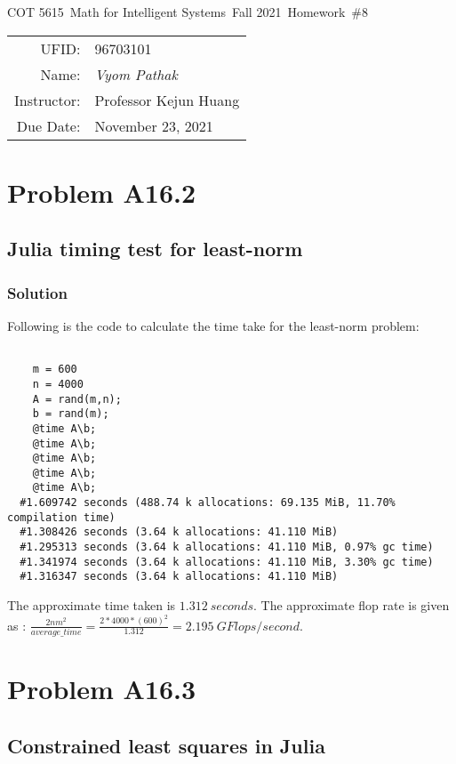 \documentclass{article}
\newcommand{\hmwkTitle}{Homework\ \#8}
\newcommand{\hmwkDueDate}{November 23, 2021}
\newcommand{\hmwkClassCode}{COT 5615}
\newcommand{\hmwkClass}{Math for Intelligent Systems}
\newcommand{\hmwkClassYear}{Fall 2021}
\newcommand{\hmwkClassInstructor}{Professor Kejun Huang}
\newcommand{\hmwkAuthorName}{\textit{Vyom Pathak}}
\newcommand{\hmwkUFID}{96703101}
\begin{document}
\begin{center}
{\Large \hmwkClassCode\ \hmwkClass\ \hmwkClassYear\ \hmwkTitle}

\begin{tabular}{rl}
UFID: & \hmwkUFID \\
Name: & \hmwkAuthorName \\
Instructor: & \hmwkClassInstructor \\
Due Date: & \hmwkDueDate \\ 
\end{tabular}
\end{center}

\section*{Problem A16.2}
\subsection*{Julia timing test for least-norm}
\subsubsection*{Solution}
Following is the code to calculate the time take for the least-norm problem:
\begin{verbatim}
    
    m = 600
    n = 4000
    A = rand(m,n);
    b = rand(m);
    @time A\b;
    @time A\b;
    @time A\b;
    @time A\b;
    @time A\b;
  #1.609742 seconds (488.74 k allocations: 69.135 MiB, 11.70% compilation time)
  #1.308426 seconds (3.64 k allocations: 41.110 MiB)
  #1.295313 seconds (3.64 k allocations: 41.110 MiB, 0.97% gc time)
  #1.341974 seconds (3.64 k allocations: 41.110 MiB, 3.30% gc time)
  #1.316347 seconds (3.64 k allocations: 41.110 MiB)
    \end{verbatim}
The approximate time taken is  $1.312\ seconds$. The approximate flop rate is given as : $\frac{2nm^2}{average\_time} = \frac{2*4000*(600)^2}{1.312} = 2.195\ GFlops/second$.
\section*{Problem A16.3}
\subsection*{Constrained least squares in Julia}
\end{document}

